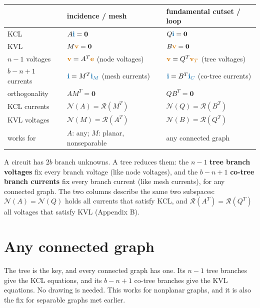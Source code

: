 \documentclass[11pt,a4paper]{article}
\newcommand{\Icol}[1]{\textcolor{ccur}{#1}}
\newcommand{\Vcol}[1]{\textcolor{cvolt}{#1}}
\begin{document}
\begin{center}
\renewcommand{\arraystretch}{1.25}
\begin{tabular}{@{}l l l@{}}
\toprule
 & incidence / mesh & fundamental cutset / loop\\
\midrule
KCL & $A\Icol{\mathbf{i}} = \mathbf{0}$ & $Q\Icol{\mathbf{i}} = \mathbf{0}$\\
KVL & $M\Vcol{\mathbf{v}} = \mathbf{0}$ & $B\Vcol{\mathbf{v}} = \mathbf{0}$\\
$n-1$ voltages & $\Vcol{\mathbf{v}} = A^T\Vcol{\mathbf{e}}$ (node voltages)
  & $\Vcol{\mathbf{v}} = Q^T\Vcol{\mathbf{v}_T}$ (tree voltages)\\
$b-n+1$ currents & $\Icol{\mathbf{i}} = M^T\Icol{\mathbf{i}_M}$ (mesh currents)
  & $\Icol{\mathbf{i}} = B^T\Icol{\mathbf{i}_C}$ (co-tree currents)\\
orthogonality & $AM^T = \mathbf{0}$ & $QB^T = \mathbf{0}$\\
\Icol{KCL currents} & $\mathcal{N}(A) = \mathcal{R}(M^T)$ & $\mathcal{N}(Q) = \mathcal{R}(B^T)$\\
\Vcol{KVL voltages} & $\mathcal{N}(M) = \mathcal{R}(A^T)$ & $\mathcal{N}(B) = \mathcal{R}(Q^T)$\\
works for & $A$: any; $M$: planar, nonseparable & any connected graph\\
\bottomrule
\end{tabular}
\end{center}
A circuit has $2b$ branch unknowns. A tree reduces them: the $n-1$ \textbf{tree branch
voltages} fix every branch voltage (like node voltages), and the $b-n+1$ \textbf{co-tree branch
currents} fix every branch current (like mesh currents), for any connected graph. The two
columns describe the same two subspaces: $\mathcal{N}(A) = \mathcal{N}(Q)$ holds all currents
that satisfy KCL, and $\mathcal{R}(A^T) = \mathcal{R}(Q^T)$ all voltages that satisfy KVL
(Appendix B).



\section{Any connected graph}

The tree is the key, and every connected graph has one. Its $n-1$ tree branches give the
KCL equations, and its $b-n+1$ co-tree branches give the KVL equations. No drawing is needed. This works for nonplanar graphs, and it is also the fix for separable
graphs met earlier.
\end{document}
